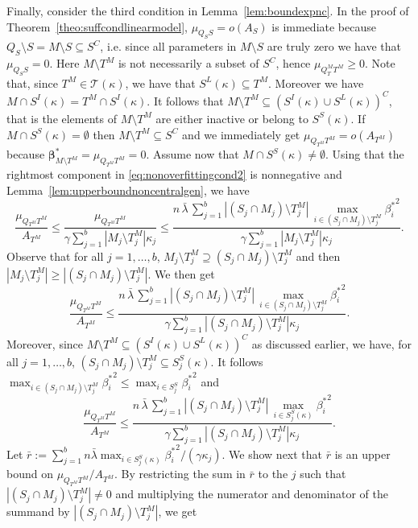 \documentclass[
  12pt]{article}
\newcommand{\T}{\mathcal{T}}
\newcommand{\bbeta}{\boldsymbol{\beta}}
\begin{document}
Finally, consider the third condition in Lemma~\ref{lem:boundexpnc}.
In the proof of Theorem~\ref{theo:suffcondlinearmodel}, $\mu_{Q_SS}=o(A_S)$ is immediate because $ Q_S \setminus S= M\setminus S\subseteq S^C$, i.e. since all parameters in $M \setminus S$ are truly zero we have that $\mu_{Q_SS}=0$.
Here $M\setminus T^M$ is not necessarily a subset of $S^C$, hence $\mu_{Q_T^M T^M} \geq 0$. Note that, since $T^M\in\T(\kappa)$, we have that $S^L(\kappa)\subseteq T^M$. Moreover we have $M\cap S^{I}(\kappa)=T^M\cap S^{I}(\kappa)$. It follows that $M\setminus T^M\subseteq (S^{I}(\kappa) \cup S^L(\kappa))^C$, that is the elements of $M\setminus T^M$ are either inactive or belong to $S^S(\kappa)$. If $M\cap S^{S}(\kappa)=\emptyset$ then $M\setminus T^M\subseteq S^C$ and we immediately get $\mu_{Q_{T^M} T^M}=o(A_{T^M})$ because $\bbeta^*_{M \setminus T^M}=\mu_{Q_{T^M} T^M}=0$. Assume now that $M\cap S^{S}(\kappa)\neq\emptyset$. Using that the rightmost component in \eqref{eq:nonoverfittingcond2} is nonnegative and Lemma~\ref{lem:upperboundnoncentralgen}, we have
$$\frac{\mu_{Q_{T^M} T^M}}{ A_{T^M}} \leq \frac{\mu_{Q_{T^M} T^M}}{ \gamma\sum_{j=1}^b|M_j \setminus T^M_j|\kappa_j} \leq \frac{n\,\bar{\lambda}\,\sum_{j=1}^b|(S_j\cap M_j )\setminus T^M_j|\,\max_{i\in (S_j\cap M_j )\setminus T^M_j}{\beta_{i}^*}^2}{ \gamma\sum_{j=1}^b|M_j \setminus T^M_j|\kappa_j}.$$
Observe that for all $j=1,\ldots,b$, $M_j \setminus T^M_j \supseteq (S_j\cap M_j )\setminus T^M_j$ and then $|M_j \setminus T^M_j| \geq |(S_j\cap M_j )\setminus T^M_j|$. We then get
$$\frac{\mu_{Q_{T^M} T^M}}{ A_{T^M}} \leq \frac{n\,\bar{\lambda}\,\sum_{j=1}^b|(S_j\cap M_j )\setminus T^M_j|\,\max_{i\in(S_j\cap M_j )\setminus T^M_j}{\beta_{i}^*}^2}{ \gamma\sum_{j=1}^b|(S_j\cap M_j ) \setminus T^M_j|\kappa_j}.$$
Moreover, since  $M\setminus T^M\subseteq (S^{I}(\kappa) \cup S^L(\kappa))^C$ as discussed earlier, we have, for all $j=1,\ldots,b$, $(S_j\cap M_j )\setminus T^M_j \subseteq S^{S}_j(\kappa)$. It follows $\max_{i\in(S_j\cap M_j )\setminus T^M_j}{\beta_{i}^*}^2 \leq \max_{i\in S_j^S}{\beta_{i}^*}^2$ and
\begin{equation}\label{eq:onbfsa}
  \frac{\mu_{Q_{T^M} T^M}}{ A_{T^M}} \leq \frac{n\,\bar{\lambda}\,\sum_{j=1}^b|(S_j\cap M_j )\setminus T^M_j|\,\max_{i\in S^{S}_j(\kappa)}{\beta_{i}^*}^2}{ \gamma\sum_{j=1}^b|(S_j\cap M_j ) \setminus T^M_j|\kappa_j}.  
\end{equation}
Let $\bar{r}:=\sum_{j=1}^b n\bar{\lambda}\max_{i\in S^{S}_j(\kappa)}{\beta_i^*}^2/(\gamma\kappa_j)$. We show next that $\bar{r}$ is an upper bound on $\mu_{Q_{T^M} T^M}/ A_{T^M}$. By restricting the sum in $\bar{r}$ to the $j$ such that $|(S_j\cap M_j )\setminus T^M_j|\neq 0$ and multiplying the numerator and denominator of the summand by $|(S_j\cap M_j )\setminus T^M_j|$, we get 
\end{document}
